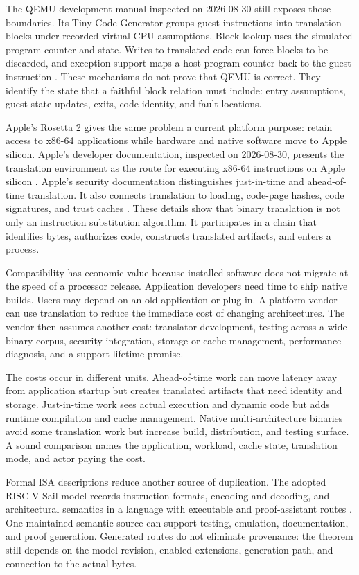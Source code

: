 The QEMU development manual inspected on 2026-08-30 still exposes those
boundaries. Its Tiny Code Generator groups guest instructions into translation
blocks under recorded virtual-CPU assumptions. Block lookup uses the simulated
program counter and state. Writes to translated code can force blocks to be
discarded, and exception support maps a host program counter back to the guest
instruction \autocite{qemu2026tcg}. These mechanisms do not prove that QEMU is
correct. They identify the state that a faithful block relation must include:
entry assumptions, guest state updates, exits, code identity, and fault
locations.

Apple's Rosetta 2 gives the same problem a current platform purpose: retain
access to x86-64 applications while hardware and native software move to Apple
silicon. Apple's developer documentation, inspected on 2026-08-30, presents
the translation environment as the route for executing x86-64 instructions on
Apple silicon \autocite{apple2026rosettaenv}. Apple's security documentation
distinguishes just-in-time and
ahead-of-time translation. It also connects translation to loading, code-page
hashes, code signatures, and trust caches \autocite{apple2021rosetta}. These
details show that binary translation is not only an instruction substitution
algorithm. It participates in a chain that identifies bytes, authorizes code,
constructs translated artifacts, and enters a process.

Compatibility has economic value because installed software does not migrate
at the speed of a processor release. Application developers need time to ship
native builds. Users may depend on an old application or plug-in. A platform
vendor can use translation to reduce the immediate cost of changing
architectures. The vendor then assumes another cost: translator development,
testing across a wide binary corpus, security integration, storage or cache
management, performance diagnosis, and a support-lifetime promise.

The costs occur in different units. Ahead-of-time work can move latency away
from application startup but creates translated artifacts that need identity
and storage. Just-in-time work sees actual execution and dynamic code but adds
runtime compilation and cache management. Native multi-architecture binaries
avoid some translation work but increase build, distribution, and testing
surface. A sound comparison names the application, workload, cache state,
translation mode, and actor paying the cost.

Formal ISA descriptions reduce another source of duplication. The adopted
RISC-V Sail model records instruction formats, encoding and decoding, and
architectural semantics in a language with executable and proof-assistant
routes \autocite{riscv2026sail}. One maintained semantic source can support
testing, emulation, documentation, and proof generation. Generated routes do
not eliminate provenance: the theorem still depends on the model revision,
enabled extensions, generation path, and connection to the actual bytes.

